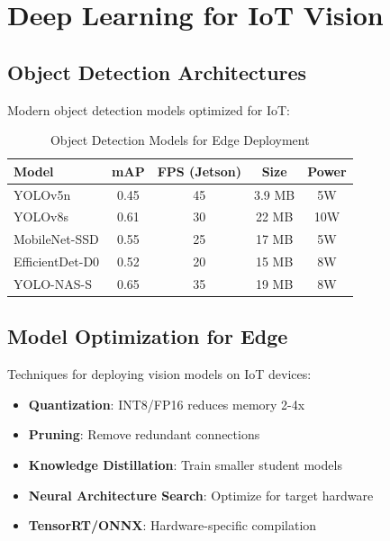 \documentclass[12pt,a4paper]{article}
\begin{document}
\section{Deep Learning for IoT Vision}

\subsection{Object Detection Architectures}

Modern object detection models optimized for IoT:

\begin{table}[H]
\centering
\caption{Object Detection Models for Edge Deployment}
\begin{tabular}{lcccc}
\toprule
\textbf{Model} & \textbf{mAP} & \textbf{FPS (Jetson)} & \textbf{Size} & \textbf{Power} \\
\midrule
YOLOv5n & 0.45 & 45 & 3.9 MB & 5W \\
YOLOv8s & 0.61 & 30 & 22 MB & 10W \\
MobileNet-SSD & 0.55 & 25 & 17 MB & 5W \\
EfficientDet-D0 & 0.52 & 20 & 15 MB & 8W \\
YOLO-NAS-S & 0.65 & 35 & 19 MB & 8W \\
\bottomrule
\end{tabular}
\end{table}

\subsection{Model Optimization for Edge}

Techniques for deploying vision models on IoT devices:

\begin{tcolorbox}[colback=visionblue!10, colframe=visionblue, title=Edge Optimization Techniques]
\begin{itemize}
    \item \textbf{Quantization}: INT8/FP16 reduces memory 2-4x
    \item \textbf{Pruning}: Remove redundant connections
    \item \textbf{Knowledge Distillation}: Train smaller student models
    \item \textbf{Neural Architecture Search}: Optimize for target hardware
    \item \textbf{TensorRT/ONNX}: Hardware-specific compilation
\end{itemize}
\end{tcolorbox}
\end{document}
